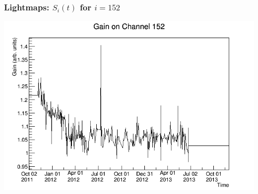 \documentclass{beamer}
\begin{document}
\begin{frame}
\begin{center}
\frametitle{Lightmaps: $S_i(t)$ for $i = 152$}
\end{center}
\vspace{0.5cm}
\begin{center}
\includegraphics[keepaspectratio=true,width=\textwidth,clip=true,trim=5mm 0mm 20mm 15mm]{gainfunc_152.png}
\end{center}
\end{frame}
\end{document}
